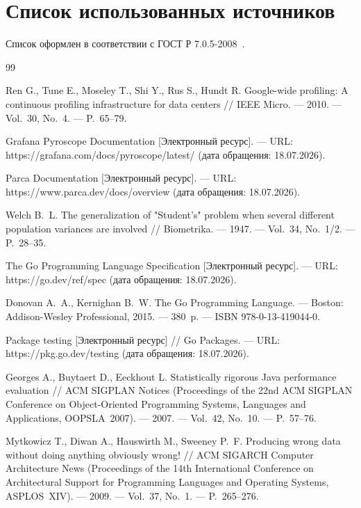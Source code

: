 \section*{Список использованных источников}

Список оформлен в соответствии с ГОСТ Р 7.0.5-2008~\cite{gost7005}.

\begin{thebibliography}{99}

Ren G., Tune E., Moseley T., Shi Y., Rus S., Hundt R. Google-wide profiling: A continuous profiling infrastructure for data centers // IEEE Micro. --- 2010. --- Vol.~30, No.~4. --- P.~65--79.

Grafana Pyroscope Documentation [Электронный ресурс]. --- URL: https://grafana.com/docs/pyroscope/latest/ (дата обращения: 18.07.2026).

Parca Documentation [Электронный ресурс]. --- URL: https://www.parca.dev/docs/overview (дата обращения: 18.07.2026).

Welch B.~L. The generalization of "Student's" problem when several different population variances are involved // Biometrika. --- 1947. --- Vol.~34, No.~1/2. --- P.~28--35.

The Go Programming Language Specification [Электронный ресурс]. --- URL: https://go.dev/ref/spec (дата обращения: 18.07.2026).

Donovan A.~A., Kernighan B.~W. The Go Programming Language. --- Boston: Addison-Wesley Professional, 2015. --- 380~p. --- ISBN 978-0-13-419044-0.

Package testing [Электронный ресурс] // Go Packages. --- URL: https://pkg.go.dev/testing (дата обращения: 18.07.2026).

Georges A., Buytaert D., Eeckhout L. Statistically rigorous Java performance evaluation // ACM SIGPLAN Notices (Proceedings of the 22nd ACM SIGPLAN Conference on Object-Oriented Programming Systems, Languages and Applications, OOPSLA~2007). --- 2007. --- Vol.~42, No.~10. --- P.~57--76.

Mytkowicz T., Diwan A., Hauswirth M., Sweeney P.~F. Producing wrong data without doing anything obviously wrong! // ACM SIGARCH Computer Architecture News (Proceedings of the 14th International Conference on Architectural Support for Programming Languages and Operating Systems, ASPLOS~XIV). --- 2009. --- Vol.~37, No.~1. --- P.~265--276.


\end{thebibliography}
